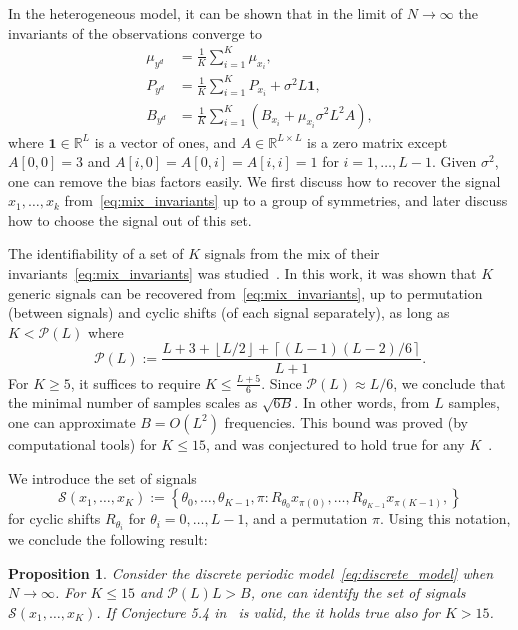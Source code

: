 \documentclass[english,12pt]{article}
\newcommand{\TODO}[1]{{\color{red}{[#1]}}}
\numberwithin{equation}{section}
\numberwithin{thm}{section} %
\newtheorem{prop}[thm]{Proposition}
\begin{document}
In the heterogeneous model, it can be shown that in the limit of $N\to\infty$ the invariants of the observations converge to \TODO{should be written more accurately} 
\begin{align} \label{eq:mix_invariants}
\mu_{y^d} &= \frac{1}{K}\sum_{i=1}^K \mu_{x_i}, \nonumber\\
P_{y^d} &= \frac{1}{K}\sum_{i=1}^K P_{x_i} + \sigma^2L\mathbf{1}, \\
B_{y^d} &= \frac{1}{K}\sum_{i=1}^K (B_{x_i} +\mu_{x_i}\sigma^2L^2 A ), \nonumber
\end{align}
where $\mathbf{1}\in\mathbb{R}^L$ is a vector of ones, and $A\in\mathbb{R}^{L\times L}$ is a zero matrix except $A[0,0]=3$ and $A[i,0]=A[0,i]=A[i,i]=1$ for $i=1,\ldots,L-1$.
Given $\sigma^2$, one can remove the bias factors easily. 
We first discuss how to recover the signal $x_1,\ldots,x_k$ from~\eqref{eq:mix_invariants} up to a group of symmetries, and later discuss how to  choose the signal out of this set. 

The identifiability of a set of $K$ signals from the mix of their  invariants~\eqref{eq:mix_invariants} was studied~\cite{bandeira2017estimation}. In this work, it was shown that $K$ generic signals can be recovered from~\eqref{eq:mix_invariants}, up to permutation (between signals) and cyclic shifts (of each signal separately), as long as $K<\mathcal{P}(L)$ where
\begin{equation} \label{eq:Pl}
\mathcal{P}(L) := \frac{L+3+\left\lfloor L/2\right\rfloor +  \left\lceil (L-1)(L-2)/6\right\rceil}{L+1}.
\end{equation}
For $K\geq 5$, it suffices to require $K\leq \frac{L+5}{6}$. 
Since $\mathcal{P}(L) \approx L/6$, we conclude that the minimal number of samples scales as $\sqrt{6B}$. In other words, from $L$ samples, one can approximate  $B=O(L^2)$ frequencies. 
This bound was proved (by computational tools) for $K\leq 15$, and was conjectured  to hold true for any $K$~\cite[Conjecture 5.4]{bandeira2017estimation}. \TODO{To stress the difference between identify the signals, and recover them.}

We introduce the set of signals \TODO{to explain where this set comes from}
\begin{equation}
\mathcal{S}(x_1,\ldots,x_K):=\left\{ \theta_0,\ldots,\theta_{K-1},\pi : R_{\theta_0}x_{\pi(0)}, \ldots,R_{\theta_{K-1}}x_{\pi(K-1)},
 \right\}
\end{equation}
for cyclic shifts $R_{\theta_i}$ for $\theta_i=0,\ldots,L-1$, and a permutation $\pi$. Using this notation, we conclude the following result:
\begin{prop} \label{prop1}
Consider the  discrete periodic model~\eqref{eq:discrete_model} when $N\to\infty$. 
For $K\leq 15$ and  $\mathcal{P}(L)L>B$, one can identify the set of signals $\mathcal{S}(x_1,\ldots,x_K)$.
If Conjecture 5.4 in~\cite{bandeira2017estimation} is valid, the it holds true also for $K>15$.
\end{prop}	
\end{document}
